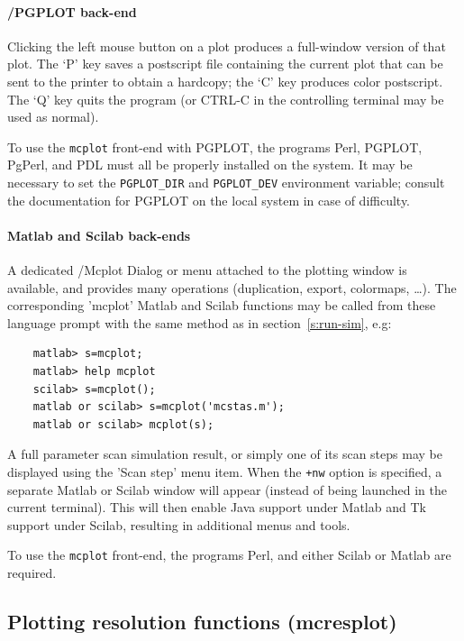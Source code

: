 \paragraph{\MCS /PGPLOT back-end}

Clicking the left mouse button on a plot produces a full-window version
of that plot. The `P' key saves a postscript file containing the current
plot that can be sent to the printer to obtain a hardcopy; the `C' key
produces color postscript. 
The `Q' key quits the program (or CTRL-C in the controlling
terminal may be used as normal).

To use the \verb+mcplot+ front-end with PGPLOT, the programs Perl, PGPLOT,
PgPerl, and PDL must all be properly installed on the system.  It may be
necessary to set the \verb+PGPLOT_DIR+ and \verb+PGPLOT_DEV+ environment
variable; consult the documentation for PGPLOT on the local system in case of
difficulty.   

\paragraph{Matlab and Scilab back-ends}

A dedicated \MCS /Mcplot Dialog or menu attached to the plotting window is available, and provides many operations (duplication, export, colormaps, \ldots).
The corresponding 'mcplot' Matlab and Scilab functions may be called from these language prompt with the same method as in section~\ref{s:run-sim}, e.g:
\begin{verbatim}
    matlab> s=mcplot;
    matlab> help mcplot
    scilab> s=mcplot();
    matlab or scilab> s=mcplot('mcstas.m');
    matlab or scilab> mcplot(s);
\end{verbatim}  
A full parameter scan simulation result, or simply one of its scan steps may be displayed using the 'Scan step' menu item.
When the \verb|+nw| option is specified, a separate Matlab or Scilab window will appear (instead of being launched in the current terminal). This will then enable Java support under Matlab and Tk support under Scilab, resulting in additional menus and tools.

To use the \verb+mcplot+ front-end, the programs Perl, and either Scilab or Matlab are required.  


\subsection{Plotting resolution functions (mcresplot)}
\label{s:mcresplot}

